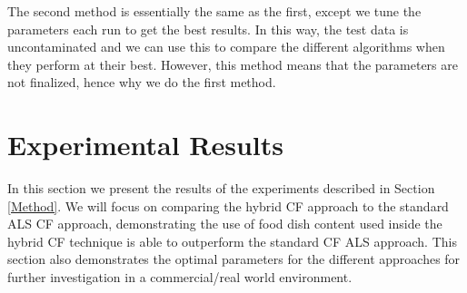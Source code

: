 The second method is essentially the same as the first, except we tune the parameters each run to get the best results. In this way, the test data is uncontaminated and we can use this to compare the different algorithms when they perform at their best. However, this method means that the parameters are not finalized, hence why we do the first method. 



\section{Experimental Results}

In this section we present the results of the experiments described in Section \ref{Method}. We will focus on comparing the hybrid CF approach to the standard ALS CF approach, demonstrating the use of food dish content used inside the hybrid CF technique is able to outperform the standard CF ALS approach. This section also demonstrates the optimal parameters for the different approaches for further investigation in a commercial/real world environment.  

